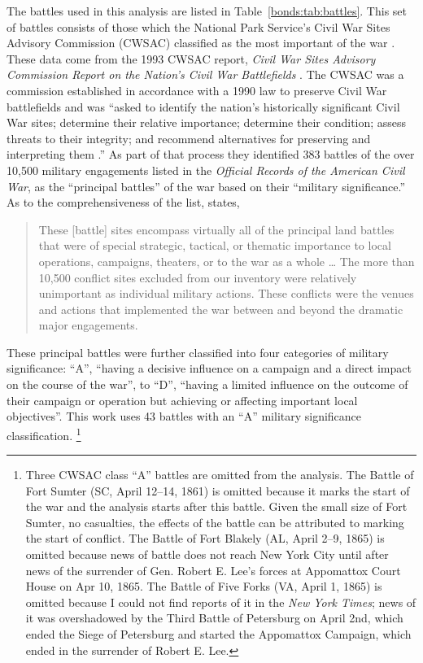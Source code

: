 The battles used in this analysis are listed in Table~\ref{bonds:tab:battles}.
This set of battles consists of those which the National Park Service's Civil War Sites Advisory Commission (CWSAC) classified as the most important of the war \parencite{CWSAC1993}.
These data come from the 1993 CWSAC report, \textit{Civil War Sites Advisory Commission Report on the Nation's Civil War Battlefields} \parencites{CWSAC1993}{CWSAC1993b}.
The CWSAC was a commission established in accordance with a 1990 law to preserve Civil War battlefields and was ``asked to identify the nation's historically significant Civil War sites; determine their relative importance; determine their condition; assess threats to their integrity; and recommend alternatives for preserving and interpreting them \parencite{CWSAC1993b}.''
As part of that process they identified 383 battles of the over 10,500 military engagements listed in the \textit{Official Records of the American Civil War}, as the ``principal battles'' of the war based on their ``military significance.''
As to the comprehensiveness of the list, \textcite{CWSAC1993} states,
\begin{quote}
  These [battle] sites encompass virtually all of the principal land battles that were of special strategic, tactical, or thematic importance to local operations, campaigns, theaters, or to the war as a whole \dots{}
  The more than 10,500 conflict sites excluded from our inventory were relatively unimportant as individual military actions.
  These conflicts were the venues and actions that implemented the war between and beyond the dramatic major engagements.
\end{quote}
These principal battles were further classified into four categories of military significance: ``A'', ``having a decisive influence on a campaign and a direct impact on the course of the war'', to ``D'', ``having a limited influence on the outcome of their campaign or operation but achieving or affecting important local objectives''.
This work uses 43 battles with an ``A'' military significance classification.%
\footnote{
  Three CWSAC class ``A'' battles are omitted from the analysis.
  The Battle of Fort Sumter (SC, April 12--14, 1861) is omitted because it marks the start of the war and the analysis starts after this battle.
  Given the small size of Fort Sumter, no casualties, the effects of the battle can be attributed to marking the start of conflict.
  The Battle of Fort Blakely (AL, April 2--9, 1865) is omitted because news of battle does not reach New York City until after news of the surrender of Gen. Robert E. Lee's forces at Appomattox Court House on Apr 10, 1865.
  The Battle of Five Forks (VA, April 1, 1865) is omitted because I could not find reports of it in the \textit{New York Times}; news of it was overshadowed by the Third Battle of Petersburg on April 2nd, which ended the Siege of Petersburg and started the Appomattox Campaign, which ended in the surrender of Robert E. Lee.
}
